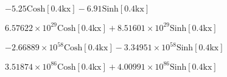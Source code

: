 \documentclass{article}
\begin{document}
\begin{doublespace}
\noindent\(-5.25 \text{Cosh}[0.4 \text{kx}]-6.91 \text{Sinh}[0.4 \text{kx}]\)
\end{doublespace}

\begin{doublespace}
\noindent\(6.57622\times 10^{29} \text{Cosh}[0.4 \text{kx}]+8.51601\times 10^{29} \text{Sinh}[0.4 \text{kx}]\)
\end{doublespace}

\begin{doublespace}
\noindent\(-2.66889\times 10^{58} \text{Cosh}[0.4 \text{kx}]-3.34951\times 10^{58} \text{Sinh}[0.4 \text{kx}]\)
\end{doublespace}

\begin{doublespace}
\noindent\(3.51874\times 10^{86} \text{Cosh}[0.4 \text{kx}]+4.00991\times 10^{86} \text{Sinh}[0.4 \text{kx}]\)
\end{doublespace}

\begin{doublespace}
\noindent\(\pmb{\text{}}\)
\end{doublespace}
\end{document}
